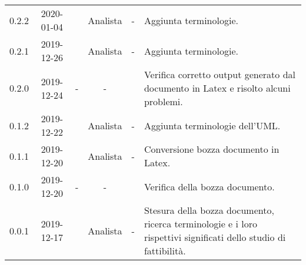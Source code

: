 {\begin{longtable}{ c c  C{2.5cm} c c C{3.5cm}}
0.2.2 & 2020-01-04 & \MC{} & Analista & - & Aggiunta terminologie. \\

0.2.1 & 2019-12-26 & \MC{} & Analista & - & Aggiunta terminologie. \\

0.2.0 & 2019-12-24 & - & - & \DF{} & Verifica corretto output generato dal documento in Latex e risolto alcuni problemi. \\

0.1.2 & 2019-12-22 & \CE{} & Analista & - & Aggiunta terminologie dell'UML. \\

0.1.1 & 2019-12-20 & \MC{} & Analista & - & Conversione bozza documento in Latex. \\
		
0.1.0 & 2019-12-20 & - & - & \DF{} & Verifica della bozza documento. \\
		
0.0.1 & 2019-12-17 & \MC{} & Analista & - & Stesura della bozza documento, ricerca terminologie e i loro rispettivi significati dello studio di fattibilità. \\
		
\end{longtable}
}
